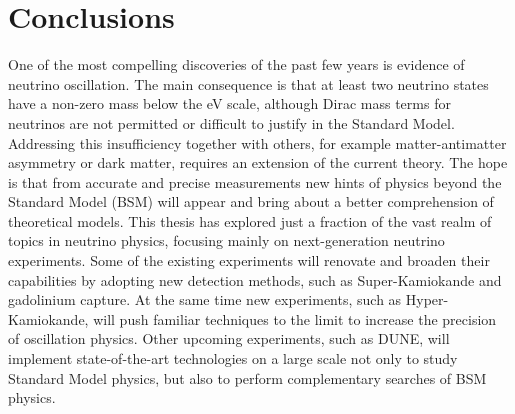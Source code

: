 \clearpage
\chapter{Conclusions}
\label{sec:conclusions}

One of the most compelling discoveries of the past few years is evidence of neutrino oscillation.
The main consequence is that at least two neutrino states have %
a non-zero mass below the eV scale, although Dirac mass terms for neutrinos are not permitted or difficult to justify %
in the Standard Model.
Addressing this insufficiency together with others, for example matter-antimatter asymmetry or dark matter, %
requires an extension of the current theory.
The hope is that from accurate and precise measurements new hints of physics beyond the Standard Model (BSM) will appear %
and bring about a better comprehension of theoretical models.
This thesis has explored just a fraction of the vast realm of topics in neutrino physics, %
focusing mainly on next-generation neutrino experiments.
Some of the existing experiments will renovate and broaden their capabilities %
by adopting new detection methods, such as Super-Kamiokande and gadolinium capture.
At the same time new experiments, such as Hyper-Kamiokande, will %
push familiar techniques to the limit to increase the precision of oscillation physics.
Other upcoming experiments, such as DUNE, will implement state-of-the-art technologies on a large scale %
not only to study Standard Model physics, but also to perform complementary searches of BSM physics.

